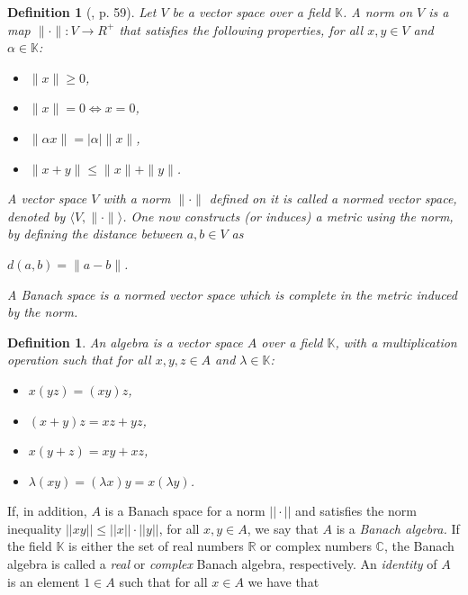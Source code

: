 \documentclass[12pt, oneside]{book}
\newtheorem{definition}[theorem]{Definition}
\begin{document}
\begin{definition} [\cite{K}, p. 59]
\normalfont
Let $V$ be a vector space over a field $\mathbb{K}$. 
A {\sl norm} on $V$ is a map $\|\cdot\| : V \rightarrow R^+$ that satisfies the following properties,
for all $x, y \in V$ and $\alpha \in \mathbb{K}$:
\begin{itemize}
\item[N1.] \quad  $\|x \| \geqslant 0$,
\item[N2.] \quad  $\|x \| = 0 \iff x = 0$,
\item[N3.] \quad  $\| \alpha x \| = |\alpha| \|x\|$,
\item[N4.] \quad  $\| x + y \| \leqslant \|x\| + \|y\|$.
\end{itemize}

\noindent A vector space $V$ with a norm $\|\cdot\|$ defined on it is called a {\sl normed} vector space,
 denoted by $\langle V, \|\cdot\| \rangle$.  One now constructs (or induces) a {\sl metric} using the norm, by defining the distance between $a, b \in V$ as
\begin{center}
$d(a, b) = \|a - b\|$.
\end{center}
\noindent A {\sl Banach space} is a normed vector space which is complete in the metric induced by the 
norm. 
\end{definition}
\begin{definition}
\normalfont
\noindent An {\sl algebra} is a vector space $A$ over a field $\mathbb{K}$, with a multiplication
operation such that for all $x, y, z \in A$  and  $\lambda \in \mathbb{K}$:
\begin{itemize}
\item[BA1.] \quad  $x(yz) =  (xy)z$,
\item[BA2.] \quad  $(x + y)z = xz + yz$,
\item[BA3.] \quad  $x(y + z) = xy + xz$,
\item[BA4.] \quad  $\lambda(xy) = (\lambda x)y = x(\lambda y)$.
\end{itemize}
\end{definition}
\noindent If, in addition, $A$ is a Banach space for a norm $||\cdot||$ and satisfies the norm inequality 
$||xy|| \leq ||x||\cdot||y||$, for all $x, y \in A$, we say that $A$ is a {\sl Banach algebra.}
\vskip 0.3cm
\noindent If the field $\mathbb{K}$ is either the set of real numbers $\mathbb{R}$ or complex numbers 
$\mathbb{C}$, the Banach algebra is called a {\sl real} or {\sl complex} Banach algebra, respectively.
\vskip 0.3cm
\noindent An {\sl identity} of $A$ is an element $1 \in A$ such that for all $x \in A$ we have that 
\end{document}

